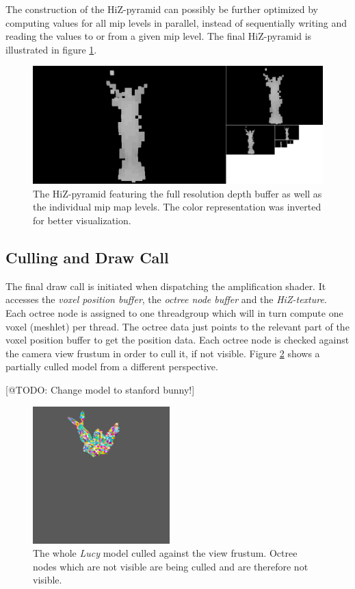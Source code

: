 \noindent
The construction of the \ac{HiZ}-pyramid can possibly be further optimized by computing values for all mip levels 
in parallel, instead of sequentially writing and reading the values to or from a given mip level. 
The final \ac{HiZ}-pyramid is illustrated in figure \ref{fig:lucy-hiz-pyramid}.

\begin{figure}[h]
    \centering
    \includegraphics[width=\linewidth]{images/graphics/lucy-hiz-pyramid-inverted.jpg}
    \caption{The \ac{HiZ}-pyramid featuring the full resolution depth buffer as well as the individual mip map 
    levels. The color representation was inverted for better visualization.}
    \label{fig:lucy-hiz-pyramid}
\end{figure}

\subsection*{Culling and Draw Call}

The final draw call is initiated when dispatching the amplification shader. It accesses the \emph{voxel position buffer}, 
the \emph{octree node buffer} and the \emph{\ac{HiZ}-texture}. Each octree node is assigned to one threadgroup which will 
in turn compute one voxel (meshlet) per thread. The octree data just points to the relevant part of the voxel position buffer 
to get the position data. Each octree node is checked against the camera view frustum in order to cull it, if not visible.
Figure \ref{fig:lucy-frustum-culling} shows a partially culled model from a different perspective. 

[@TODO: Change model to stanford bunny!]
\begin{figure}[h]
    \centering
    \includegraphics[width=200px]{images/graphics/lucy-frustum-culling.jpg}
    \caption{The whole \emph{Lucy} model culled against the view frustum. Octree nodes which are not visible are being 
    culled and are therefore not visible.}
    \label{fig:lucy-frustum-culling}
\end{figure}


